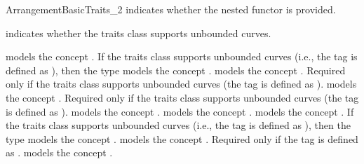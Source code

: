 \begin{ccRefConcept}{ArrangementBasicTraits_2}
  {indicates whether the nested functor  is
  provided.} 

  {indicates whether the traits class supports unbounded curves.}

\ccThreeToTwo
{}
  {models the concept .
  If the traits class supports unbounded curves (i.e., the
   tag is defined as ), then
  the type models the concept .}
\ccGlue
{}
\ccGlue
{}
  {models the concept .
  Required only if the traits class supports unbounded curves
  (the  tag is defined as ).}
\ccGlue
{}
  {models the concept .
  Required only if the traits class supports unbounded curves
  (the  tag is defined as ).}
\ccGlue
{}
  {models the concept .}
\ccGlue
{}
  {models the concept .}
\ccGlue
{}
\ccGlue
{}
  {models the concept .
  If the traits class supports unbounded curves (i.e., the
   tag is defined as ), then
  the type models the concept .}
\ccGlue
{}
  {models the concept .
  Required only if the  tag is defined as
  .}
\ccGlue
{}
  {models the concept .}
\ccGlue
{}

{}


\end{ccRefConcept}
